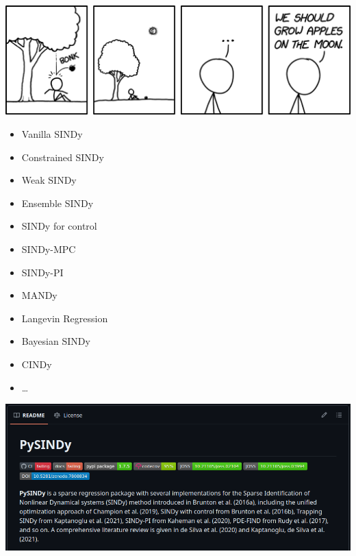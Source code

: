 \documentclass[aspectratio=169,compress,12pt,dvipsnames]{beamer}
\begin{document}
\begin{frame}[plain]
    \vfill
    \centering
    \includegraphics[width=.8\textwidth]{imgs/newton.png}
    \vfill
\end{frame}

\begin{frame}
	\vfill
        \small
        \begin{multicols}{2}
            \begin{itemize}
                \item Vanilla SINDy
                \item Constrained SINDy
                \item Weak SINDy
                \item Ensemble SINDy
                \item SINDy for control
                \item SINDy-MPC
                \item SINDy-PI
                \item MANDy
                \item Langevin Regression
                \item Bayesian SINDy
                \item CINDy
                \item \ldots
            \end{itemize}
            \end{multicols}
    	\vfill
\end{frame}

\begin{frame}
    \vfill
    \centering
    \includegraphics[width=.8\textwidth]{imgs/pysindy.png}
    \vfill
\end{frame}
\end{document}
